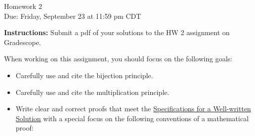 \documentclass[12pt]{article}
\begin{document}
\begin{center}
{\Large Homework 2}\\
Due: Friday, September 23 at 11:59 pm CDT\\


\end{center}
{\bf Instructions:} Submit a pdf of your solutions to the HW 2 assignment on Gradescope. 

When working on this assignment, you should focus on the following goals:
\begin{itemize}
\item Carefully use and cite the bijection principle.
\item Carefully use and cite the multiplication principle.
\item Write clear and correct proofs that meet the \href{https://docs.google.com/document/d/18LfQoqi6BsY2VdAlpC5xdYEA2rxSGoH0891nVec4_Os/edit?usp=sharing}{Specifications for a Well-written Solution} with a special focus on the following conventions of a mathematical proof:
\end{itemize}
\end{document}
